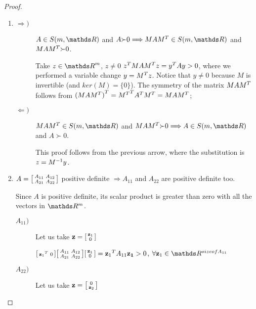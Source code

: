 \documentclass[ComputationalMathematics.tex]{subfiles}
\begin{document}
\begin{proof}~\\
   \begin{enumerate}
    \item
      \begin{description}
        \item[$\Rightarrow)$]
          $A \in S(m, \R)$ and $A {\succ} 0  \Longrightarrow MA\tr{M} \in S(m, \R)$ and $MA{M}^{T} {\succ} 0$.

          Take $z \in {\R}^m$, $z\neq 0$ ${z}^{T} MA{M}^{T} z = {y}^{T} Ay > 0$, where we performed a variable change $y = {M}^{T} z$. Notice that $y \neq 0$ because $M$ is invertible (and $ker(M) = \{ 0 \}$). The symmetry of the matrix $MA{M}^{T}$ follows from ${(MA{M}^{T})}^{T} = {{M}^{T}}^{T} {A}^{T} {M}^{T} = MA{M}^{T}$;
        \item[$\Leftarrow)$]
          $MA\tr{M} \in S(m, \R)$ and $MA\tr{M} {\succ} 0  \Longrightarrow A \in S(m, \R)$ and $A {\succ} 0$.
          
          This proof follows from the previous arrow, where the substitution is $z = {M}^{-1}y$.
            \end{description}
     \item $A = \begin{bsmallmatrix}
	    A_{11} & A_{12}\\
	    A_{21} & A_{22}
     \end{bsmallmatrix}$ positive definite $\Longrightarrow A_{11}$ and $A_{22}$ are positive definite too.

      Since $A$ is positive definite, its scalar product is greater than zero with all the vectors in $\R^m$. 
  \begin{description}
    \item[$A_{11})$]
      Let us take $\mathbf{z}=
        \begin{bsmallmatrix}
          \mathbf{z}_1\\0
        \end{bsmallmatrix}$

        $\begin{bsmallmatrix}
          {\mathbf{z}_1}^{T} &0\\
        \end{bsmallmatrix}  
        \begin{bsmallmatrix}
	        A_{11} & A_{12}\\
	        A_{21} & A_{22}
        \end{bsmallmatrix} 
        \begin{bsmallmatrix}
          \mathbf{z}_1\\0
        \end{bsmallmatrix}
        = {\mathbf{z}_1}^{T} A_{11} \mathbf{z_1} > 0$, $\forall \mathbf{z}_1 \in \R^{size of A_{11}}$
      \item[$A_{22})$]
      Let us take $\mathbf{z}=
      \begin{bsmallmatrix}
        0\\\mathbf{z}_2
      \end{bsmallmatrix}$


\end{description}
\end{enumerate}
\end{proof}
\end{document}
